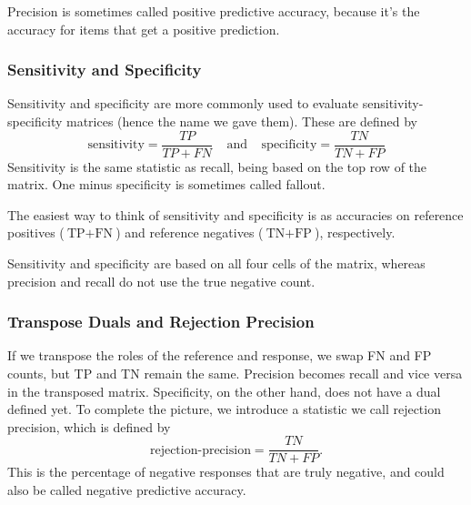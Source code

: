 Precision is sometimes called positive predictive accuracy, because
it's the accuracy for items that get a positive prediction.

\subsubsection{Sensitivity and Specificity}

Sensitivity and specificity are more commonly used to evaluate
sensitivity-specificity matrices (hence the name we gave them). 
These are defined by 
%
\begin{equation}
\mbox{sensitivity} = \frac{TP}{TP+FN}
\ \ \ \ \ \mbox{and} \ \ \ \ \ 
\mbox{specificity} = \frac{TN}{TN+FP}
\end{equation}
%
Sensitivity is the same statistic as recall, being based on the top
row of the matrix.  One minus specificity is sometimes called fallout.

The easiest way to think of sensitivity and specificity is as
accuracies on reference positives ($\mbox{TP}+\mbox{FN}$) and
reference negatives ($\mbox{TN}+\mbox{FP}$), respectively.

Sensitivity and specificity are based on all four cells of the matrix,
whereas precision and recall do not use the true negative count.

\subsubsection{Transpose Duals and Rejection Precision}

If we transpose the roles of the reference and response, we swap FN
and FP counts, but TP and TN remain the same.  Precision becomes
recall and vice versa in the transposed matrix.  Specificity, on
the other hand, does not have a dual defined yet.  To complete the
picture, we introduce a statistic we call rejection precision,
which is defined by
%
\begin{equation}
\mbox{rejection-precision}
= \frac{TN}{TN+FP}.
\end{equation}
%
This is the percentage of negative responses that are truly negative,
and could also be called negative predictive accuracy.  

